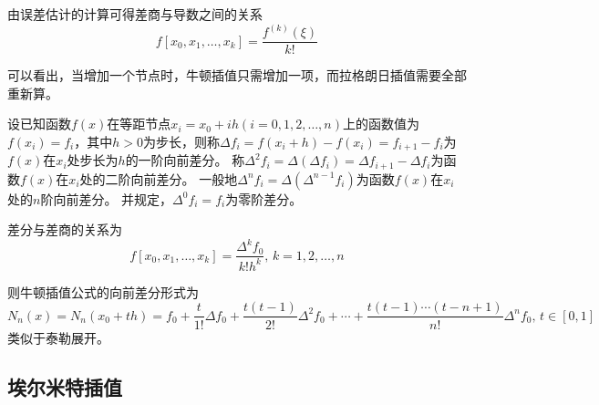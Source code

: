 由误差估计的计算可得差商与导数之间的关系
\[f[x_0,x_1,\ldots,x_k]=\frac{f^{(k)}(\xi)}{k!}\]

可以看出，当增加一个节点时，牛顿插值只需增加一项，而拉格朗日插值需要全部重新算。

\begin{definition}[差分]
设已知函数$f(x)$在等距节点$x_i=x_0+ih(i=0,1,2,\ldots,n)$上的函数值为$f(x_i)=f_i$，其中$h>0$为步长，则称$\Delta f_i=f(x_i+h)-f(x_i)=f_{i+1}-f_i$为$f(x)$在$x_i$处步长为$h$的一阶向前差分。
称$\Delta^2 f_i=\Delta(\Delta f_i)=\Delta f_{i+1}-\Delta f_i$为函数$f(x)$在$x_i$处的二阶向前差分。
一般地$\Delta^n f_i=\Delta(\Delta^{n-1} f_i)$为函数$f(x)$在$x_i$处的$n$阶向前差分。
并规定，$\Delta^0 f_i=f_i$为零阶差分。
\end{definition}
\par 差分与差商的关系为
\[f[x_0,x_1,\ldots,x_k]=\frac{\Delta^k f_0}{k!h^k},\,k=1,2,\ldots,n\]

则牛顿插值公式的向前差分形式为
\[N_n(x)=N_n(x_0+th)=f_0+\frac{t}{1!}\Delta f_0+\frac{t(t-1)}{2!}\Delta^2 f_0+\cdots+\frac{t(t-1)\cdots(t-n+1)}{n!}\Delta^n f_0,\,t\in[0,1]\]
类似于泰勒展开。

\subsection{埃尔米特插值}
